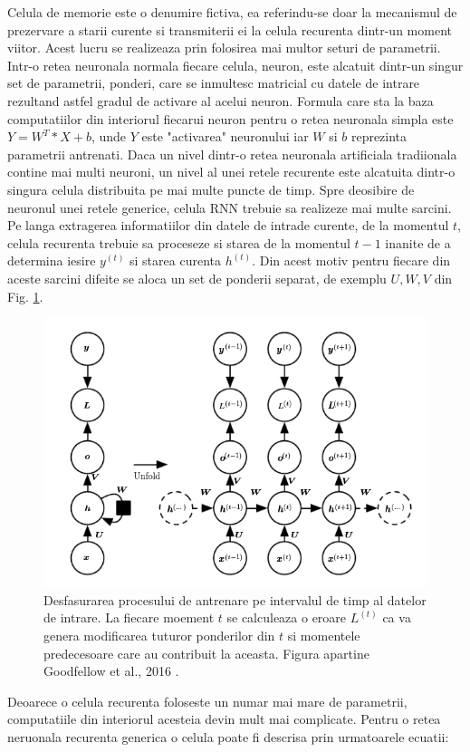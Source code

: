 \documentclass[a4paper,12pt]{book}
\begin{document}
				Celula de memorie este o denumire fictiva, ea referindu-se doar la mecanismul de prezervare a starii curente si transmiterii ei la celula recurenta dintr-un moment viitor. Acest lucru se realizeaza prin folosirea mai multor seturi de parametrii. Intr-o retea neuronala normala fiecare celula, neuron, este alcatuit dintr-un singur set de parametrii, ponderi, care se inmultesc matricial cu datele de intrare rezultand astfel gradul de activare al acelui neuron. Formula care sta la baza computatiilor din interiorul fiecarui neuron pentru o retea neuronala simpla  este $Y = W^T * X + b$, unde $Y$ este "activarea" neuronului iar $W$ si $b$  reprezinta parametrii antrenati. Daca un nivel dintr-o retea neuronala artificiala tradiionala contine mai multi neuroni, un nivel al unei retele recurente este alcatuita dintr-o singura celula distribuita pe mai multe puncte de timp. Spre deosibire de neuronul unei retele generice, celula RNN trebuie sa realizeze mai multe sarcini. Pe langa extragerea informatiilor din datele de intrade curente, de la momentul $t$, celula recurenta trebuie sa proceseze si starea de la momentul $t-1$ inanite de a determina iesire $y^{(t)}$ si starea curenta $h^{(t)}$. Din acest motiv pentru fiecare din aceste sarcini difeite se aloca un set de ponderii separat, de exemplu $U, W, V$ din Fig. \ref{fig:rnn_layer}.
				
				\begin{figure}[h]
					\centering
					\includegraphics[scale=0.6]{rnn_layer}
					\caption{Desfasurarea procesului de antrenare pe intervalul de timp al datelor de intrare. La fiecare moement $t$ se calculeaza o eroare $L^{(t)}$ ca va genera modificarea tuturor ponderilor din $t$ si momentele predecesoare care au contribuit la aceasta. Figura apartine Goodfellow et al., 2016 \cite{dpb}.}
					\label{fig:rnn_layer}
				\end{figure} 
			Deoarece o celula recurenta foloseste un numar mai mare de parametrii, computatiile din interiorul acesteia devin mult mai complicate. Pentru o retea neruonala recurenta generica o celula poate fi descrisa prin urmatoarele ecuatii:
				
\end{document}
